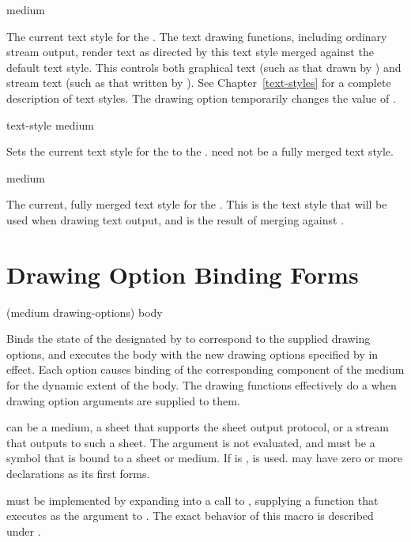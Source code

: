  {medium}

The current text style for the  .  The text drawing
functions, including ordinary stream output, render text as directed by this
text style merged against the default text style.  This controls both graphical
text (such as that drawn by ) and stream text (such as that
written by ).  See Chapter~\ref{text-styles} for a complete
description of text styles.  The  drawing option temporarily
changes the value of .

 {text-style medium}

Sets the current text style for the   to the  .   need not be a fully merged text
style.


 {medium}

The current, fully merged text style for the  .  This
is the text style that will be used when drawing text output, and is the result
of merging  against .


\section {Drawing Option Binding Forms}

 {(medium \rest drawing-options) \body body}

Binds the state of the  designated by  to correspond to
the supplied drawing options, and executes the body with the new drawing options
specified by  in effect.  Each option causes binding of the
corresponding component of the medium for the dynamic extent of the body.  The
drawing functions effectively do a  when drawing option
arguments are supplied to them.

 can be a medium, a sheet that supports the sheet output protocol,
or a stream that outputs to such a sheet.  The  argument is not
evaluated, and must be a symbol that is bound to a sheet or medium.  If
 is ,  is used.   may have
zero or more declarations as its first forms.

 must be implemented by expanding into a call to
, supplying a function that executes 
as the  argument to .  The exact
behavior of this macro is described under .

